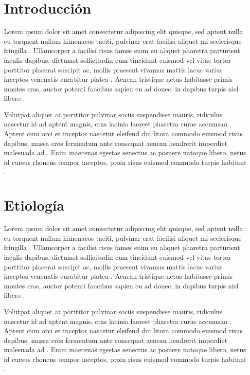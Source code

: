 \documentclass{article}
\begin{document}
\newpage
{}

\twocolumn %

\section{Introducción}

Lorem ipsum dolor sit amet consectetur adipiscing elit quisque, sed aptent nulla eu torquent nullam himenaeos taciti, pulvinar erat facilisi aliquet mi scelerisque fringilla \cite{C}. Ullamcorper a facilisi risus fames enim eu aliquet pharetra parturient iaculis dapibus, dictumst sollicitudin cum tincidunt euismod vel vitae tortor porttitor placerat suscipit ac, mollis praesent vivamus mattis lacus varius inceptos venenatis curabitur platea \cite{A}. Aenean tristique netus habitasse primis montes cras, auctor potenti faucibus sapien eu ad donec, in dapibus turpis nisl libero \cite{B}.

Volutpat aliquet at porttitor pulvinar sociis suspendisse mauris, ridiculus nascetur id ad aptent magnis, cras lacinia laoreet pharetra curae accumsan \cite{A}. Aptent cum orci et inceptos nascetur eleifend dui litora commodo euismod risus dapibus, massa eros fermentum ante consequat aenean hendrerit imperdiet malesuada ad \cite{B}. Enim maecenas egestas senectus ac posuere natoque libero, netus id cursus rhoncus tempor inceptos, proin risus euismod commodo turpis habitant \cite{C}.

\section {Etiología}

Lorem ipsum dolor sit amet consectetur adipiscing elit quisque, sed aptent nulla eu torquent nullam himenaeos taciti, pulvinar erat facilisi aliquet mi scelerisque fringilla \cite{C}. Ullamcorper a facilisi risus fames enim eu aliquet pharetra parturient iaculis dapibus, dictumst sollicitudin cum tincidunt euismod vel vitae tortor porttitor placerat suscipit ac, mollis praesent vivamus mattis lacus varius inceptos venenatis curabitur platea \cite{A}. Aenean tristique netus habitasse primis montes cras, auctor potenti faucibus sapien eu ad donec, in dapibus turpis nisl libero \cite{B}.

Volutpat aliquet at porttitor pulvinar sociis suspendisse mauris, ridiculus nascetur id ad aptent magnis, cras lacinia laoreet pharetra curae accumsan \cite{A}. Aptent cum orci et inceptos nascetur eleifend dui litora commodo euismod risus dapibus, massa eros fermentum ante consequat aenean hendrerit imperdiet malesuada ad \cite{B}. Enim maecenas egestas senectus ac posuere natoque libero, netus id cursus rhoncus tempor inceptos, proin risus euismod commodo turpis habitant \cite{C}.
\end{document}
